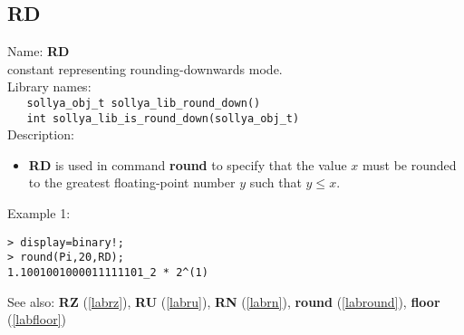 \subsection{RD}
\label{labrd}
\noindent Name: \textbf{RD}\\
\phantom{aaa}constant representing rounding-downwards mode.\\[0.2cm]
\noindent Library names:\\
\verb|   sollya_obj_t sollya_lib_round_down()|\\
\verb|   int sollya_lib_is_round_down(sollya_obj_t)|\\[0.2cm]
\noindent Description: \begin{itemize}

\item \textbf{RD} is used in command \textbf{round} to specify that the value $x$ must be rounded
   to the greatest floating-point number $y$ such that $y \le x$.
\end{itemize}
\noindent Example 1: 
\begin{center}\begin{minipage}{15cm}\begin{Verbatim}[frame=single]
> display=binary!;
> round(Pi,20,RD);
1.1001001000011111101_2 * 2^(1)
\end{Verbatim}
\end{minipage}\end{center}
See also: \textbf{RZ} (\ref{labrz}), \textbf{RU} (\ref{labru}), \textbf{RN} (\ref{labrn}), \textbf{round} (\ref{labround}), \textbf{floor} (\ref{labfloor})
